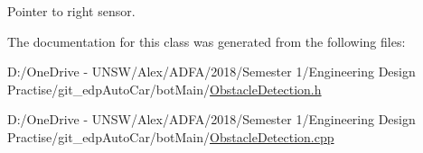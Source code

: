 Pointer to right sensor. 



The documentation for this class was generated from the following files\+:\begin{DoxyCompactItemize}
\item 
D\+:/\+One\+Drive -\/ U\+N\+S\+W/\+Alex/\+A\+D\+F\+A/2018/\+Semester 1/\+Engineering Design Practise/git\+\_\+edp\+Auto\+Car/bot\+Main/\mbox{\hyperlink{_obstacle_detection_8h}{Obstacle\+Detection.\+h}}\item 
D\+:/\+One\+Drive -\/ U\+N\+S\+W/\+Alex/\+A\+D\+F\+A/2018/\+Semester 1/\+Engineering Design Practise/git\+\_\+edp\+Auto\+Car/bot\+Main/\mbox{\hyperlink{_obstacle_detection_8cpp}{Obstacle\+Detection.\+cpp}}\end{DoxyCompactItemize}
